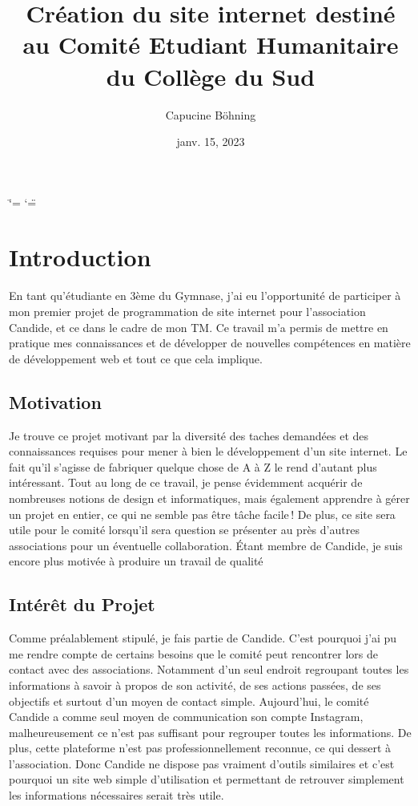 \documentclass[a4,10pt,french]{sphinxmanual}
\title{Création du site internet destiné au Comité Etudiant Humanitaire du Collège du Sud}
\date{janv. 15, 2023}
\author{Capucine Böhning}
\begin{document}
\ifdefined\shorthandoff
  \ifnum\catcode`\=\string=\active\shorthandoff{=}\fi
  \ifnum\catcode`\"=\active{}\fi
\fi

\pagestyle{empty}
\sphinxmaketitle
\pagestyle{plain}
\sphinxtableofcontents
\pagestyle{normal}
\label{\detokenize{index::doc}}



\chapter{Introduction}
\label{\detokenize{introduction:introduction}}\label{\detokenize{introduction::doc}}
\sphinxAtStartPar
En tant qu’étudiante en 3ème du Gymnase, j’ai eu l’opportunité de participer à mon premier projet de programmation de site internet pour l’association Candide, et ce dans le cadre de mon TM. Ce travail m’a permis de mettre en pratique mes connaissances et de développer de nouvelles compétences en matière de développement web et tout ce que cela implique.


\section{Motivation}
\label{\detokenize{introduction:motivation}}
\sphinxAtStartPar
Je trouve ce projet motivant par la diversité des taches demandées et des connaissances requises pour mener à bien le développement d’un site internet. Le fait qu’il s’agisse de fabriquer quelque chose de A à Z le rend d’autant plus intéressant. Tout au long de ce travail, je pense évidemment acquérir de nombreuses notions de design et informatiques, mais également apprendre à gérer un projet en entier, ce qui ne semble pas être tâche facile ! De plus, ce site sera utile pour le comité lorsqu’il sera question se présenter au près d’autres associations pour un éventuelle collaboration. Étant membre de Candide, je suis encore plus motivée à produire un travail de qualité


\section{Intérêt du Projet}
\label{\detokenize{introduction:interet-du-projet}}
\sphinxAtStartPar
Comme préalablement stipulé, je fais partie de Candide. C’est pourquoi j’ai pu me rendre compte de certains besoins que le comité peut rencontrer lors de contact avec des associations. Notamment d’un seul endroit regroupant toutes les informations à savoir à propos de son activité, de ses actions passées, de ses objectifs et surtout d’un moyen de contact simple.
Aujourd’hui, le comité Candide a comme seul moyen de communication son compte Instagram, malheureusement ce n’est pas suffisant pour regrouper toutes les informations. De plus, cette plateforme n’est pas professionnellement reconnue, ce qui dessert à l’association. Donc Candide ne dispose pas vraiment d’outils similaires et c’est pourquoi un site web simple d’utilisation et permettant de retrouver simplement les informations nécessaires serait très utile.
\end{document}
